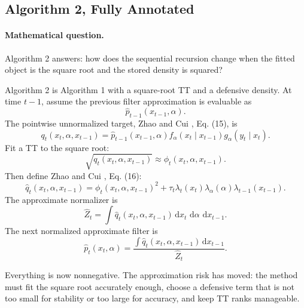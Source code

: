\documentclass[11pt]{article}
\numberwithin{equation}{section}
\newcommand{\dd}{\,\mathrm d}
\begin{document}
\subsection{Algorithm 2, Fully Annotated}

\paragraph{Mathematical question.}
Algorithm 2 answers: how does the sequential recursion change when the fitted
object is the square root and the stored density is squared?

Algorithm 2 is Algorithm 1 with a square-root TT and a defensive density.
At time \(t-1\), assume the previous filter approximation is evaluable as
\[
    \widehat p_{t-1}(x_{t-1},\alpha).
\]
The pointwise unnormalized target, Zhao and Cui \cite{zhao2024ttsequential}, Eq. (15), is
\begin{equation}
    q_t(x_t,\alpha,x_{t-1})
    =
    \widehat p_{t-1}(x_{t-1},\alpha)
    f_\alpha(x_t\mid x_{t-1})
    g_\alpha(y_t\mid x_t).
    \label{eq:p24-a2-1}
\end{equation}
Fit a TT to the square root:
\begin{equation}
    \sqrt{q_t(x_t,\alpha,x_{t-1})}
    \approx
    \phi_t(x_t,\alpha,x_{t-1}).
    \label{eq:p24-a2-2}
\end{equation}
Then define Zhao and Cui \cite{zhao2024ttsequential}, Eq. (16):
\begin{equation}
    \widehat q_t(x_t,\alpha,x_{t-1})
    =
    \phi_t(x_t,\alpha,x_{t-1})^2
    +
    \tau_t\lambda_t(x_t)\lambda_\alpha(\alpha)\lambda_{t-1}(x_{t-1}).
    \label{eq:p24-a2-3}
\end{equation}
The approximate normalizer is
\begin{equation}
    \widehat Z_t
    =
    \int \widehat q_t(x_t,\alpha,x_{t-1})
    \dd x_t\,\dd\alpha\,\dd x_{t-1}.
    \label{eq:p24-a2-4}
\end{equation}
The next normalized approximate filter is
\begin{equation}
    \widehat p_t(x_t,\alpha)
    =
    \frac{\int \widehat q_t(x_t,\alpha,x_{t-1})\dd x_{t-1}}
    {\widehat Z_t}.
    \label{eq:p24-a2-5}
\end{equation}

Everything is now nonnegative.  The approximation risk has moved: the method
must fit the square root accurately enough, choose a defensive term that is not
too small for stability or too large for accuracy, and keep TT ranks manageable.
\end{document}

